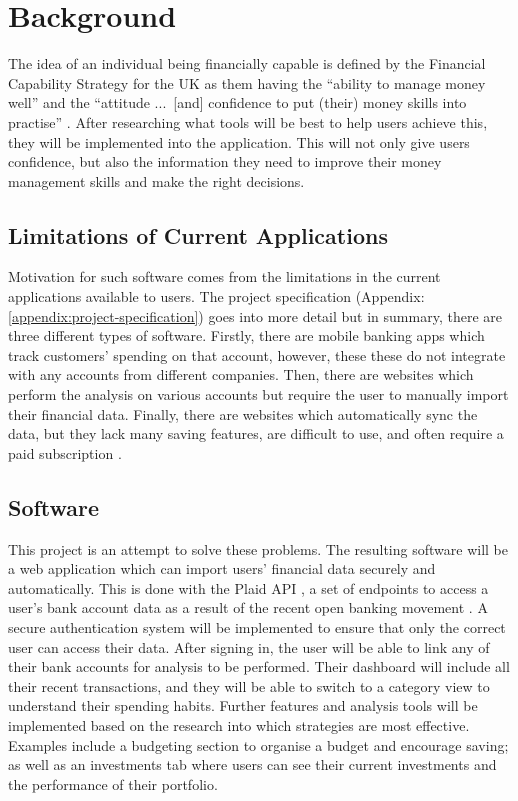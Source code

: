 \section{Background}
\label{sec:background}

The idea of an individual being financially capable is defined by the Financial Capability Strategy for the UK as them having the ``ability to manage money well'' and the ``attitude ...\ [and] confidence to put (their) money skills into practise'' \cite{FinancialCapabilityUK}. After researching what tools will be best to help users achieve this, they will be implemented into the application. This will not only give users confidence, but also the information they need to improve their money management skills and make the right decisions.


\subsection{Limitations of Current Applications}
Motivation for such software comes from the limitations in the current applications available to users. The project specification (Appendix: \ref{appendix:project-specification}) goes into more detail but in summary, there are three different types of software. Firstly, there are mobile banking apps which track customers' spending on that account, however, these these do not integrate with any accounts from different companies. Then, there are websites which perform the analysis on various accounts but require the user to manually import their financial data. Finally, there are websites which automatically sync the data, but they lack many saving features, are difficult to use, and often require a paid subscription \cite{PersonalFinanceAppsComparison}.

\subsection{Software}
This project is an attempt to solve these problems. The resulting software will be a web application which can import users' financial data securely and automatically. This is done with the Plaid API \cite{Plaid}, a set of endpoints to access a user's bank account data as a result of the recent open banking movement \cite{OpenBanking}. A secure authentication system will be implemented to ensure that only the correct user can access their data. After signing in, the user will be able to link any of their bank accounts for analysis to be performed. Their dashboard will include all their recent transactions, and they will be able to switch to a category view to understand their spending habits. Further features and analysis tools will be implemented based on the research into which strategies are most effective. Examples include a budgeting section to organise a budget and encourage saving; as well as an investments tab where users can see their current investments and the performance of their portfolio.

